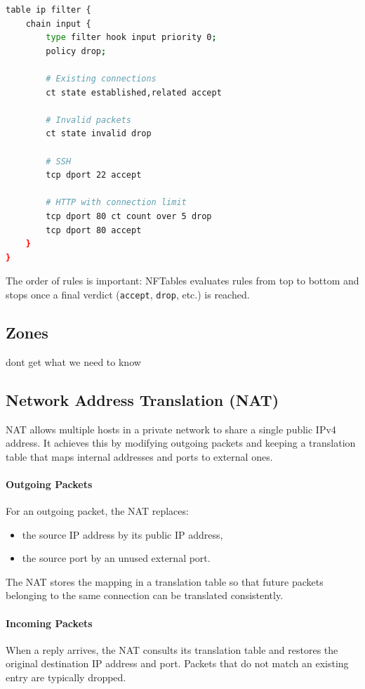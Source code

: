 \begin{lstlisting}[language=bash]
table ip filter {
    chain input {
        type filter hook input priority 0;
        policy drop;

        # Existing connections
        ct state established,related accept

        # Invalid packets
        ct state invalid drop

        # SSH
        tcp dport 22 accept

        # HTTP with connection limit
        tcp dport 80 ct count over 5 drop
        tcp dport 80 accept
    }
}
\end{lstlisting}

The order of rules is important: NFTables evaluates rules from top to bottom and stops once a final verdict (\texttt{accept}, \texttt{drop}, etc.) is reached.
\subsection{Zones}
dont get what we need to know


\subsection{Network Address Translation (NAT)}

NAT allows multiple hosts in a private network to share a single public
IPv4 address. It achieves this by modifying outgoing packets and keeping
a translation table that maps internal addresses and ports to external
ones.

\paragraph{Outgoing Packets}
For an outgoing packet, the NAT replaces:

\begin{itemize}
    \item the source IP address by its public IP address,
    \item the source port by an unused external port.
\end{itemize}

The NAT stores the mapping in a translation table so that future packets
belonging to the same connection can be translated consistently.

\paragraph{Incoming Packets}
When a reply arrives, the NAT consults its translation table and
restores the original destination IP address and port. Packets that do
not match an existing entry are typically dropped.

